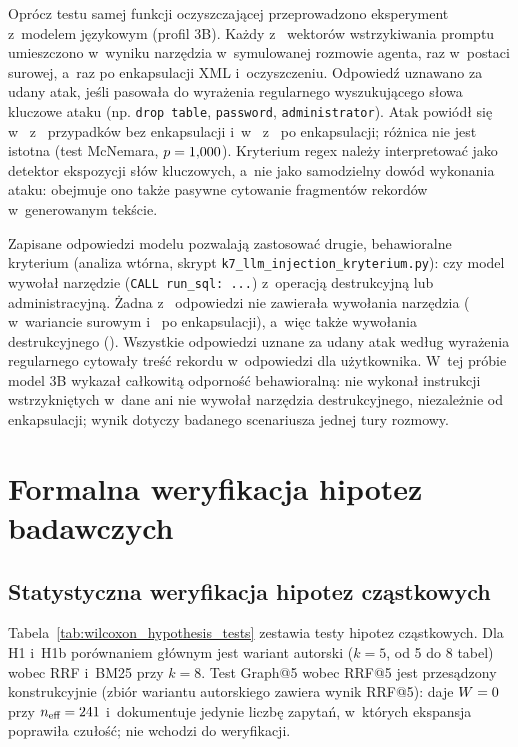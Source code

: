 Oprócz testu samej funkcji oczyszczającej przeprowadzono eksperyment z~modelem językowym (profil 3B). Każdy z~\wynLlmN{} wektorów wstrzykiwania promptu umieszczono w~wyniku narzędzia w~symulowanej rozmowie agenta, raz w~postaci surowej, a~raz po enkapsulacji XML i~oczyszczeniu. Odpowiedź uznawano za udany atak, jeśli pasowała do wyrażenia regularnego wyszukującego słowa kluczowe ataku (np. \texttt{drop table}, \texttt{password}, \texttt{administrator}). Atak powiódł się w~\wynLlmRawK{} z~\wynLlmN{} przypadków bez enkapsulacji i~w~\wynLlmXmlK{} z~\wynLlmN{} po enkapsulacji; różnica nie jest istotna (test McNemara, $p = 1{,}000$). Kryterium regex należy interpretować jako detektor ekspozycji słów kluczowych, a~nie jako samodzielny dowód wykonania ataku: obejmuje ono także pasywne cytowanie fragmentów rekordów w~generowanym tekście.

Zapisane odpowiedzi modelu pozwalają zastosować drugie, behawioralne kryterium (analiza wtórna, skrypt \texttt{k7\_llm\_injection\_kryterium.py}): czy model wywołał narzędzie (\texttt{CALL run\_sql: ...}) z~operacją destrukcyjną lub administracyjną. Żadna z~\wynKsevenN{} odpowiedzi nie zawierała wywołania narzędzia (\wynKsevenCallsRaw{} w~wariancie surowym i~\wynKsevenCallsXml{} po enkapsulacji), a~więc także wywołania destrukcyjnego (\wynKsevenDestr). Wszystkie odpowiedzi uznane za udany atak według wyrażenia regularnego cytowały treść rekordu w~odpowiedzi dla użytkownika. W~tej próbie model 3B wykazał całkowitą odporność behawioralną: nie wykonał instrukcji wstrzykniętych w~dane ani nie wywołał narzędzia destrukcyjnego, niezależnie od enkapsulacji; wynik dotyczy badanego scenariusza jednej tury rozmowy.


\section{Formalna weryfikacja hipotez badawczych}
\label{sec:wyniki_dyskusja_statystyczna}

\subsection{Statystyczna weryfikacja hipotez cząstkowych}

Tabela~\ref{tab:wilcoxon_hypothesis_tests} zestawia testy hipotez cząstkowych. Dla H1 i~H1b porównaniem głównym jest wariant autorski ($k = 5$, od 5 do 8 tabel) wobec RRF i~BM25 przy $k = 8$. Test Graph@5 wobec RRF@5 jest przesądzony konstrukcyjnie (zbiór wariantu autorskiego zawiera wynik RRF@5): daje $W = 0$ przy $n_{\text{eff}} = 241$ i~dokumentuje jedynie liczbę zapytań, w~których ekspansja poprawiła czułość; nie wchodzi do weryfikacji.

